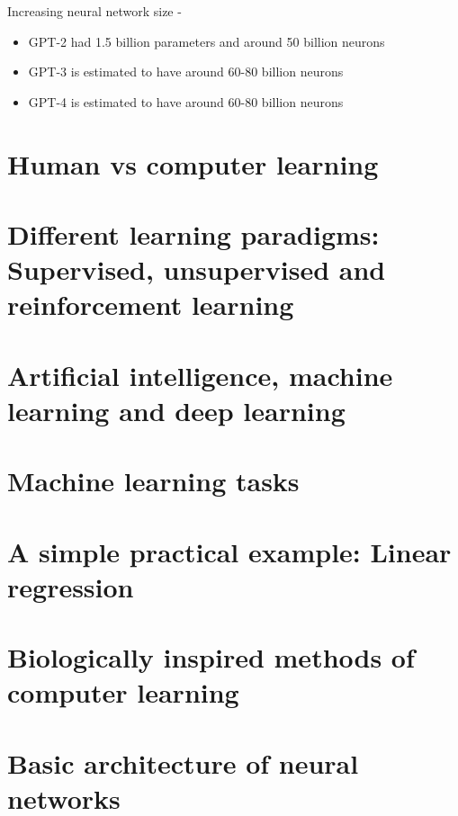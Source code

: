 \begin{frame}[t,allowframebreaks]{Increasing neural network size - }
    \framebreak


    \begin{itemize}
        \item GPT-2 had 1.5 billion parameters and around 50 billion neurons
        \item GPT-3 is estimated to have around 60-80 billion neurons
        \item GPT-4 is estimated to have around 60-80 billion neurons
    \end{itemize}

\end{frame}


\section{Human vs computer learning}


\section{Different learning paradigms: Supervised, unsupervised and reinforcement learning}

\section{Artificial intelligence, machine learning and deep learning}

\section{Machine learning tasks}

\section{A simple practical example: Linear regression}

\section{Biologically inspired methods of computer learning}

\section{Basic architecture of neural networks}

